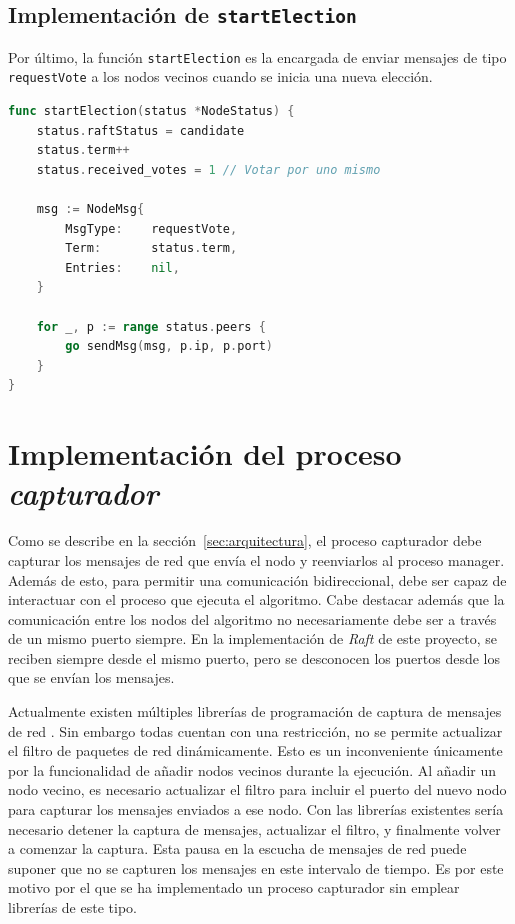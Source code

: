 \subsection{Implementación de \texttt{startElection}}

Por último, la función \texttt{startElection} es la encargada de enviar mensajes de tipo \texttt{requestVote} a los nodos vecinos cuando se inicia una nueva elección. 

\begin{lstlisting}[language=go]
func startElection(status *NodeStatus) {
	status.raftStatus = candidate
	status.term++
	status.received_votes = 1 // Votar por uno mismo

	msg := NodeMsg{
		MsgType:    requestVote,
		Term:       status.term,
		Entries:    nil,
	}

	for _, p := range status.peers {
		go sendMsg(msg, p.ip, p.port)
	}
}
\end{lstlisting}

\section{Implementación del proceso \textit{capturador}}

Como se describe en la sección~\ref{sec:arquitectura}, el proceso capturador debe capturar los mensajes de red que envía el nodo y reenviarlos al proceso manager. Además de esto, para permitir una comunicación bidireccional, debe ser capaz de interactuar con el proceso que ejecuta el algoritmo. Cabe destacar además que la comunicación entre los nodos del algoritmo no necesariamente debe ser a través de un mismo puerto siempre. En la implementación de \textit{Raft} de este proyecto, se reciben siempre desde el mismo puerto, pero se desconocen los puertos desde los que se envían los mensajes.

Actualmente existen múltiples librerías de programación de captura de mensajes de red \cite{libcap}\cite{pyshark}\cite{pypcap}. Sin embargo todas cuentan con una restricción, no se permite actualizar el filtro de paquetes de red dinámicamente. Esto es un inconveniente únicamente por la funcionalidad de añadir nodos vecinos durante la ejecución. Al añadir un nodo vecino, es necesario actualizar el filtro para incluir el puerto del nuevo nodo para capturar los mensajes enviados a ese nodo. Con las librerías existentes sería necesario detener la captura de mensajes, actualizar el filtro, y finalmente volver a comenzar la captura. Esta pausa en la escucha de mensajes de red puede suponer que no se capturen los mensajes en este intervalo de tiempo. Es por este motivo por el que se ha implementado un proceso capturador sin emplear librerías de este tipo.

